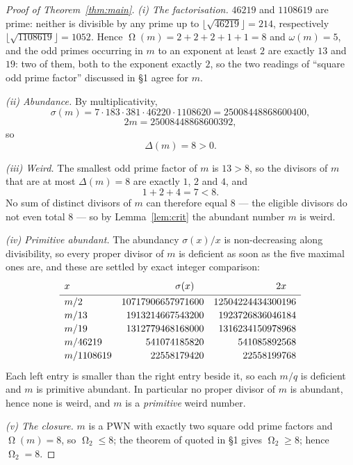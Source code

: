 \documentclass[11pt]{amsart}
\DeclareMathOperator{\Om}{\Omega}
\newcommand{\sig}{\sigma}
\begin{document}
\begin{proof}[Proof of Theorem~\ref{thm:main}]
\emph{(i) The factorisation.} $46219$ and $1108619$ are prime: neither is
divisible by any prime up to $\lfloor\sqrt{46219}\rfloor=214$, respectively
$\lfloor\sqrt{1108619}\rfloor=1052$. Hence
$\Om(m)=2+2+2+1+1=8$ and $\omega(m)=5$, and the odd primes occurring in $m$
to an exponent at least $2$ are exactly $13$ and $19$: two of them, both to
the exponent exactly $2$, so the two readings of ``square odd prime factor''
discussed in \S1 agree for $m$.

\emph{(ii) Abundance.} By multiplicativity,
\[
 \sig(m)=7\cdot183\cdot381\cdot46220\cdot1108620=25008448868600400 ,
\]
\[
 2m=25008448868600392 ,
\]
so
\[
 \Delta(m)=8>0 .
\]

\emph{(iii) Weird.} The smallest odd prime factor of $m$ is $13>8$, so the
divisors of $m$ that are at most $\Delta(m)=8$ are exactly $1$, $2$ and $4$,
and
\[
 1+2+4=7<8 .
\]
No sum of distinct divisors of $m$ can therefore equal $8$ --- the eligible
divisors do not even total $8$ --- so by Lemma~\ref{lem:crit} the abundant
number $m$ is weird.

\emph{(iv) Primitive abundant.} The abundancy $\sig(x)/x$ is non-decreasing
along divisibility, so every proper divisor of $m$ is deficient as soon as
the five maximal ones are, and these are settled by exact integer
comparison:
\[
\renewcommand{\arraystretch}{1.15}
\begin{array}{lrr}
 x & \sig(x)\hphantom{00} & 2x\hphantom{00}\\[2pt]
 \hline
 m/2       & 10717906657971600 & 12504224434300196\\
 m/13      & 1913214667543200  & 1923726836046184\\
 m/19      & 1312779468168000  & 1316234150978968\\
 m/46219   & 541074185820      & 541085892568\\
 m/1108619 & 22558179420       & 22558199768
\end{array}
\]
Each left entry is smaller than the right entry beside it, so each $m/q$ is
deficient and $m$ is primitive abundant. In particular no proper divisor of
$m$ is abundant, hence none is weird, and $m$ is a \emph{primitive} weird
number.

\emph{(v) The closure.} $m$ is a PWN with exactly two square odd prime
factors and $\Om(m)=8$, so $\Om_2\le8$; the theorem of \cite{AHMP19} quoted
in \S1 gives $\Om_2\ge8$; hence $\Om_2=8$.
\end{proof}
\end{document}
